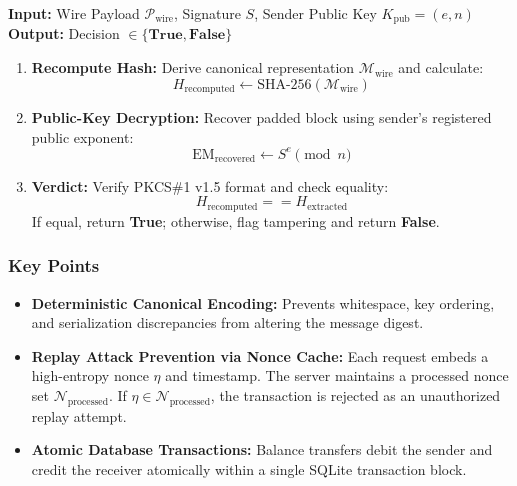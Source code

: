\documentclass[11pt,a4paper]{article}
\begin{document}
\begin{tcolorbox}[colback=codebg,colframe=codeborder,title=\textbf{Algorithm 2: Bank-Side Signature Verification Procedure}]
\textbf{Input:} Wire Payload $\mathcal{P}_{\text{wire}}$, Signature $S$, Sender Public Key $K_{\text{pub}} = (e, n)$\\
\textbf{Output:} Decision $\in \{\textbf{True}, \textbf{False}\}$
\begin{enumerate}
    \item \textbf{Recompute Hash:} Derive canonical representation $\mathcal{M}_{\text{wire}}$ and calculate:
    \begin{equation}
        H_{\text{recomputed}} \leftarrow \text{SHA-256}(\mathcal{M}_{\text{wire}})
    \end{equation}
    \item \textbf{Public-Key Decryption:} Recover padded block using sender's registered public exponent:
    \begin{equation}
        \text{EM}_{\text{recovered}} \leftarrow S^e \pmod n
    \end{equation}
    \item \textbf{Verdict:} Verify PKCS\#1 v1.5 format and check equality:
    \begin{equation}
        H_{\text{recomputed}} == H_{\text{extracted}}
    \end{equation}
    If equal, return \textbf{True}; otherwise, flag tampering and return \textbf{False}.
\end{enumerate}
\end{tcolorbox}

\subsubsection{Key Points}
\begin{itemize}
    \item \textbf{Deterministic Canonical Encoding:} Prevents whitespace, key ordering, and serialization discrepancies from altering the message digest.
    \item \textbf{Replay Attack Prevention via Nonce Cache:} Each request embeds a high-entropy nonce $\eta$ and timestamp. The server maintains a processed nonce set $\mathcal{N}_{\text{processed}}$. If $\eta \in \mathcal{N}_{\text{processed}}$, the transaction is rejected as an unauthorized replay attempt.
    \item \textbf{Atomic Database Transactions:} Balance transfers debit the sender and credit the receiver atomically within a single SQLite transaction block.
\end{itemize}
\end{document}
